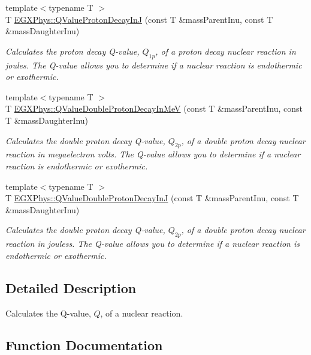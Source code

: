 \begin{DoxyCompactItemize}
{\footnotesize template$<$typename T $>$ }\\T \hyperlink{group___q_value_gaa344322393356bd442d17c992628218a}{E\+G\+X\+Phys\+::\+Q\+Value\+Proton\+Decay\+InJ} (const T \&mass\+Parent\+Inu, const T \&mass\+Daughter\+Inu)
\begin{DoxyCompactList}\small\item\em Calculates the proton decay Q-\/value, $Q_{1p}$, of a proton decay nuclear reaction in joules. The Q-\/value allows you to determine if a nuclear reaction is endothermic or exothermic. \end{DoxyCompactList}\item 
{\footnotesize template$<$typename T $>$ }\\T \hyperlink{group___q_value_ga4a57c8901e92918f08bee52493b81c59}{E\+G\+X\+Phys\+::\+Q\+Value\+Double\+Proton\+Decay\+In\+MeV} (const T \&mass\+Parent\+Inu, const T \&mass\+Daughter\+Inu)
\begin{DoxyCompactList}\small\item\em Calculates the double proton decay Q-\/value, $Q_{2p}$, of a double proton decay nuclear reaction in megaelectron volts. The Q-\/value allows you to determine if a nuclear reaction is endothermic or exothermic. \end{DoxyCompactList}\item 
{\footnotesize template$<$typename T $>$ }\\T \hyperlink{group___q_value_ga64a3867f65de5586feab99527bb03d31}{E\+G\+X\+Phys\+::\+Q\+Value\+Double\+Proton\+Decay\+InJ} (const T \&mass\+Parent\+Inu, const T \&mass\+Daughter\+Inu)
\begin{DoxyCompactList}\small\item\em Calculates the double proton decay Q-\/value, $Q_{2p}$, of a double proton decay nuclear reaction in jouless. The Q-\/value allows you to determine if a nuclear reaction is endothermic or exothermic. \end{DoxyCompactList}\end{DoxyCompactItemize}


\subsection{Detailed Description}
Calculates the Q-\/value, $Q$, of a nuclear reaction. 

\subsection{Function Documentation}
\mbox{\label{group___q_value_ga3e767be294dae24e1df18e7ccb8989e6}} 
